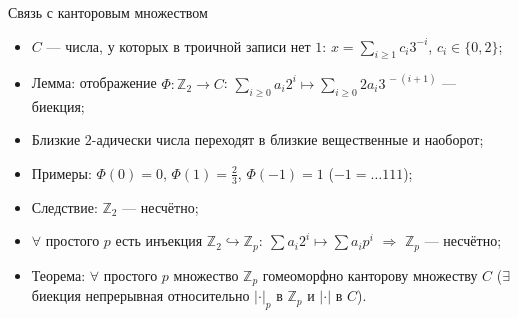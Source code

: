 \documentclass[serif, aspectratio=169]{beamer}
\newcommand{\sagemark}{%
  \textcolor{green!40!black}{\textbf{\texttt{sage:...}}}%
}
\begin{document}
\begin{frame}{Связь с канторовым множеством}
\begin{itemize}
\begin{minipage}[t]{0.5\linewidth}
{
        }

        \end{minipage}

        \item $C$ --- числа, у которых в троичной записи нет $1$:
        $x=\sum_{i\geqslant1}c_i3^{-i}$, $c_i\in\{0,2\}$;
        \item Лемма: отображение $\Phi:\mathbb{Z}_2\to C$: $\sum_{i\geqslant0}a_i2^i \mapsto \sum_{i\geqslant0}2a_i 3^{\,-(i+1)}$ --- биекция;
        \item Близкие $2$-адически числа переходят в близкие вещественные и наоборот;
        \item Примеры: $\Phi(0)=0$, $\Phi(1)=\frac23$, $\Phi(-1)=1$ ($-1=\dots111$);
        \item Следствие: $\mathbb{Z}_2$ --- несчётно;
        \item $\forall$ простого $p$ есть инъекция $\mathbb{Z}_2\hookrightarrow\mathbb{Z}_p:\ \sum a_i 2^i \mapsto \sum a_i p^i$ $\Rightarrow$ $\mathbb{Z}_p$ --- несчётно;
        \item Теорема: $\forall$ простого $p$ множество $\mathbb Z_p$ гомеоморфно канторову множеству $C$ ($\exists$ биекция непрерывная относительно $|\cdot|_p$ в $\mathbb Z_p$ и $|\cdot|$ в $C$).
    \end{itemize}

\end{frame}
\end{document}
